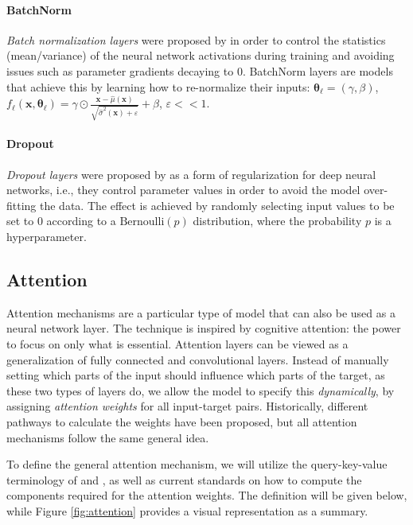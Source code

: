 \paragraph{BatchNorm} \emph{Batch normalization layers} were proposed by \cite{ioffe_batch_2015} in order to control the statistics (mean/variance) of the neural network activations during training and avoiding issues such as parameter gradients decaying to $0$. BatchNorm layers are models that achieve this by learning how to re-normalize their inputs: $\pmb{\theta}_{\ell} = (\gamma, \beta)$, $f_{\ell}(\pmb{x}, \pmb{\theta}_{\ell}) = \gamma \odot \frac{\pmb{x}-\hat{\mu}(\pmb{x})}{\sqrt{\hat{\sigma}^2(\pmb{x}) + \varepsilon}} + \beta$, $\varepsilon << 1$.

\paragraph{Dropout} \emph{Dropout layers} were proposed by \cite{hinton_improving_2012} as a form of regularization for deep neural networks, i.e., they control parameter values in order to avoid the model over-fitting the data. The effect is achieved by randomly selecting input values to be set to $0$ according to a $\text{Bernoulli}(p)$ distribution, where the probability $p$ is a hyperparameter.
 
\subsection{Attention}
Attention mechanisms are a particular type of model that can also be used as a neural network layer. The technique is inspired by cognitive attention: the power to focus on only what is essential. Attention layers can be viewed as a generalization of fully connected and convolutional layers. Instead of manually setting which parts of the input should influence which parts of the target, as these two types of layers do, we allow the model to specify this \emph{dynamically}, by assigning \emph{attention weights} for all input-target pairs. Historically, different pathways to calculate the weights have been proposed, but all attention mechanisms follow the same general idea.

To define the general attention mechanism, we will utilize the query-key-value terminology of \cite{graves_neural_2014} and \cite{vaswani_attention_2017}, as well as current standards on how to compute the components required for the attention weights. The definition will be given below, while Figure \ref{fig:attention} provides a visual representation as a summary.

